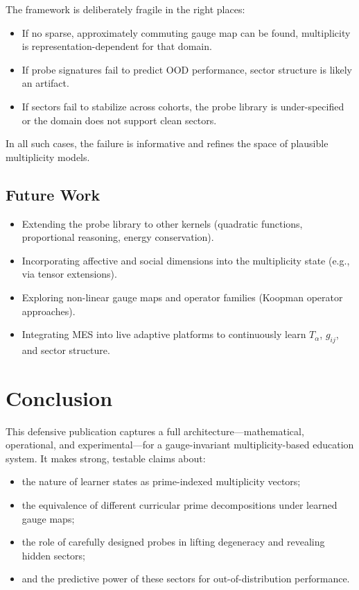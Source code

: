 \documentclass[11pt]{article}
\begin{document}
The framework is deliberately fragile in the right places:
\begin{itemize}[itemsep=3pt]
  \item If no sparse, approximately commuting gauge map can be found, multiplicity is representation-dependent for that domain.
  \item If probe signatures fail to predict OOD performance, sector structure is likely an artifact.
  \item If sectors fail to stabilize across cohorts, the probe library is under-specified or the domain does not support clean sectors.
\end{itemize}

In all such cases, the failure is informative and refines the space of plausible multiplicity models.

\subsection{Future Work}

\begin{itemize}[itemsep=3pt]
  \item Extending the probe library to other kernels (quadratic functions, proportional reasoning, energy conservation).
  \item Incorporating affective and social dimensions into the multiplicity state (e.g., via tensor extensions).
  \item Exploring non-linear gauge maps and operator families (Koopman operator approaches).
  \item Integrating MES into live adaptive platforms to continuously learn $T_\alpha$, $g_{ij}$, and sector structure.
\end{itemize}

\section*{Conclusion}

This defensive publication captures a full architecture---mathematical, operational, and experimental---for a gauge-invariant multiplicity-based education system. It makes strong, testable claims about:
\begin{itemize}[itemsep=3pt]
  \item the nature of learner states as prime-indexed multiplicity vectors;
  \item the equivalence of different curricular prime decompositions under learned gauge maps;
  \item the role of carefully designed probes in lifting degeneracy and revealing hidden sectors;
  \item and the predictive power of these sectors for out-of-distribution performance.
\end{itemize}
\end{document}

